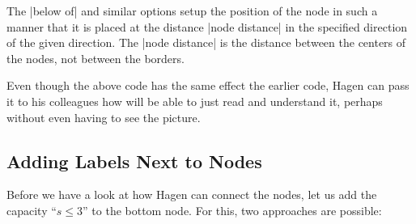 The |below of| and similar options setup the position of the node in
such a manner that it is placed at the distance |node distance| in the
specified direction of the given direction. The |node distance| is the
distance between the centers of the nodes, not between the borders.

Even though the above code has the same effect the earlier code, Hagen
can pass it to his colleagues how will be able to just read and
understand it, perhaps without even having to see the picture.



\subsection{Adding Labels Next to Nodes}

Before we have a look at how Hagen can connect the nodes, let us add
the capacity ``$s \le 3$'' to the bottom node. For this, two
approaches are possible:
